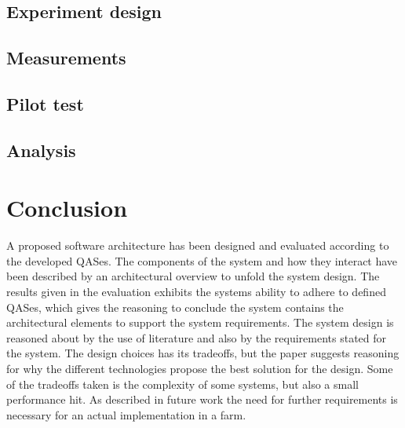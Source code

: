 \documentclass[conference]{IEEEtran}
\begin{document}
\subsection{Experiment design}
\label{sec:design}


\subsection{Measurements}
\label{sec:measurements}


\subsection{Pilot test}
\label{sec:pilot_test}

\subsection{Analysis}
\label{sec:analysis}



\section{Conclusion}
A proposed software architecture has been designed and evaluated according to the developed QASes. The components of the system and how they interact have been described by an architectural overview to unfold the system design. The results given in the evaluation exhibits the systems ability to adhere to defined QASes, which gives the reasoning to conclude the system contains the architectural elements to support the system requirements.
The system design is reasoned about by the use of literature and also by the requirements stated for the system. The design choices has its tradeoffs, but the paper suggests reasoning for why the different technologies propose the best solution for the design. Some of the tradeoffs taken is the complexity of some systems, but also a small performance hit. As described in future work the need for further requirements is necessary for an actual implementation in a farm.



\vspace{12pt}
\end{document}

